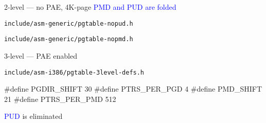 \begin{frame}{2-level --- no PAE, 4K-page}
  \textcolor{blue}{PMD and PUD are folded}
  \begin{center}
  \end{center}
  \begin{block}{\texttt{include/asm-generic/pgtable-nopud.h}}
    \begin{center}
    \end{center}
  \end{block}
  \begin{block}{\texttt{include/asm-generic/pgtable-nopmd.h}}
    \begin{center}
    \end{center}
  \end{block}
\end{frame}

\begin{frame}[fragile=singleslide]{3-level --- PAE enabled}
  \begin{center}
  \end{center}
  \begin{block}{\texttt{include/asm-i386/pgtable-3level-defs.h}}
    \begin{center}
\begin{ccode}
#define PGDIR_SHIFT  30
#define PTRS_PER_PGD 4
#define PMD_SHIFT    21
#define PTRS_PER_PMD 512
\end{ccode}
    \end{center}
    \textcolor{blue}{PUD} is eliminated
  \end{block}
\end{frame}

